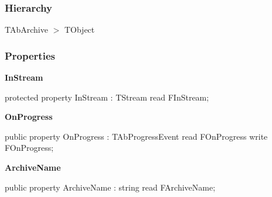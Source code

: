 \documentclass{report}
\newif\ifpdf
\begin{document}
\subsubsection*{\large{\textbf{Hierarchy}}\normalsize\hspace{1ex}\hfill}
TAbArchive {$>$} TObject
\subsubsection*{\large{\textbf{Properties}}\normalsize\hspace{1ex}\hfill}
\begin{list}{}{
\setlength{\itemindent}{0cm}
\setlength{\listparindent}{0cm}
\setlength{\leftmargin}{\evensidemargin}
\addtolength{\leftmargin}{\tmplength}
\settowidth{\labelsep}{X}
\addtolength{\leftmargin}{\labelsep}
\setlength{\labelwidth}{\tmplength}
}
\label{AbArcTyp.TAbArchive-InStream}
\item[\textbf{InStream}\hfill]
\ifpdf
\begin{flushleft}
\fi
\begin{ttfamily}
protected property InStream : TStream
      read FInStream;\end{ttfamily}

\ifpdf
\end{flushleft}
\fi


\par  \label{AbArcTyp.TAbArchive-OnProgress}
\item[\textbf{OnProgress}\hfill]
\ifpdf
\begin{flushleft}
\fi
\begin{ttfamily}
public property OnProgress : TAbProgressEvent
      read FOnProgress write FOnProgress;\end{ttfamily}

\ifpdf
\end{flushleft}
\fi


\par  \label{AbArcTyp.TAbArchive-ArchiveName}
\item[\textbf{ArchiveName}\hfill]
\ifpdf
\begin{flushleft}
\fi
\begin{ttfamily}
public property ArchiveName : string
      read FArchiveName;\end{ttfamily}

\ifpdf
\end{flushleft}
\fi



\end{list}
\end{document}
